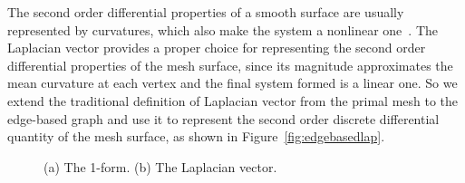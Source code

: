 The second order differential properties of  a smooth surface are
usually represented by curvatures, which also make the system a
nonlinear one~\cite{ESP08}. The Laplacian vector provides a proper
choice for representing the second order differential properties of
the mesh surface, since its magnitude approximates the mean
curvature at each vertex and the final system formed is a linear
one. So we extend the traditional definition of Laplacian vector
from the primal mesh to the edge-based graph and use it to represent
the second order discrete differential quantity of the mesh surface,
as shown in Figure~\ref{fig:edgebasedlap}.

\begin{figure} [htbp]
  \caption{(a) The 1-form. (b) The Laplacian vector.}
  \label{fig:edgebasedoneformlap} %
\end{figure}

